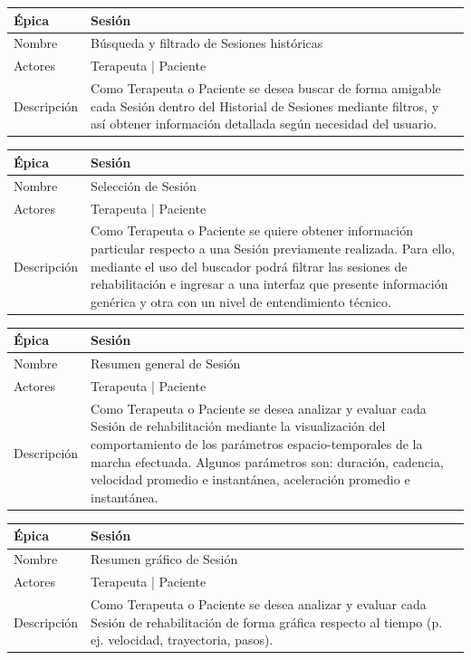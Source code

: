 \begin{table}[H] 
\centering
\begin{tabular}{| p{2cm} | p{10cm} |}
\hline
Épica & Sesión\\ \hline
Nombre & Búsqueda y filtrado de Sesiones históricas\\ \hline
Actores & Terapeuta | Paciente\\ \hline
Descripción & Como Terapeuta o Paciente se desea buscar de forma amigable cada Sesión dentro del Historial de Sesiones mediante filtros, y así obtener información detallada según necesidad del usuario. \\ \hline
\end{tabular}
\end{table}

\begin{table}[H] 
\centering
\begin{tabular}{| p{2cm} | p{10cm} |}
\hline
Épica & Sesión\\ \hline
Nombre & Selección de Sesión\\ \hline
Actores & Terapeuta | Paciente \\ \hline
Descripción & Como Terapeuta o Paciente se quiere obtener información particular respecto a una Sesión previamente realizada. Para ello, mediante el uso del buscador podrá filtrar las sesiones de rehabilitación e ingresar a una interfaz que presente información genérica y otra con un nivel de entendimiento técnico.\\ \hline
\end{tabular}
\end{table}

\begin{table}[H] 
\centering
\begin{tabular}{| p{2cm} | p{10cm} |}
\hline
Épica & Sesión\\ \hline
Nombre & Resumen general de Sesión\\ \hline
Actores & Terapeuta | Paciente\\ \hline
Descripción & Como Terapeuta o Paciente se desea analizar y evaluar cada Sesión de rehabilitación mediante la visualización del comportamiento de los parámetros espacio-temporales de la marcha efectuada. Algunos parámetros son: duración, cadencia, velocidad promedio e instantánea, aceleración promedio e instantánea.\\ \hline
\end{tabular}
\end{table}

\begin{table}[H] 
\centering
\begin{tabular}{| p{2cm} | p{10cm} |}
\hline
Épica & Sesión\\ \hline
Nombre & Resumen gráfico de Sesión\\ \hline
Actores & Terapeuta | Paciente\\ \hline
Descripción & Como Terapeuta o Paciente se desea analizar y evaluar cada Sesión de rehabilitación de forma gráfica  respecto al tiempo (p. ej. velocidad, trayectoria, pasos).\\ \hline
\end{tabular}
\end{table}

